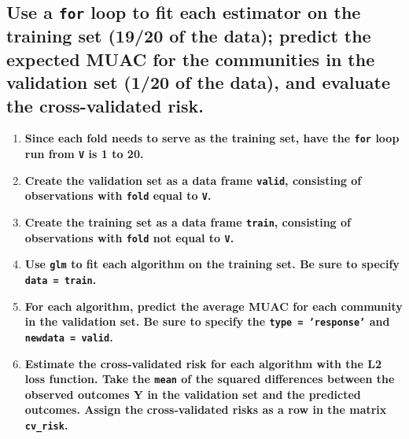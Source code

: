 \documentclass{article}\usepackage[]{graphicx}\usepackage[]{xcolor}
\begin{document}
  \subsection{Use a \texttt{for} loop to fit each estimator on the training set (19/20 of the data); predict the expected MUAC for the communities in the validation set (1/20 of the data), and evaluate the cross-validated risk.}
  \begin{enumerate}
    \item \textbf{Since each fold needs to serve as the training set, have the \texttt{for} loop run from \texttt{V} is 1 to 20.}
    \item \textbf{Create the validation set as a data frame \texttt{valid}, consisting of observations with \texttt{fold} equal to \texttt{V}.}
    \item \textbf{Create the training set as a data frame \texttt{train}, consisting of observations with \texttt{fold} not equal to \texttt{V}.}
    \item \textbf{Use \texttt{glm} to fit each algorithm on the training set. Be sure to specify \texttt{data = train}.}
    \item \textbf{For each algorithm, predict the average MUAC for each community in the validation set. Be sure to specify the \texttt{type = 'response'} and \texttt{newdata = valid}.}
    \item \textbf{Estimate the cross-validated risk for each algorithm with the L2 loss function. Take the \texttt{mean} of the squared differences between the observed outcomes Y in the validation set and the predicted outcomes. Assign the cross-validated risks as a row in the matrix \texttt{cv\_risk}.}
  \end{enumerate}
  
\end{document}
